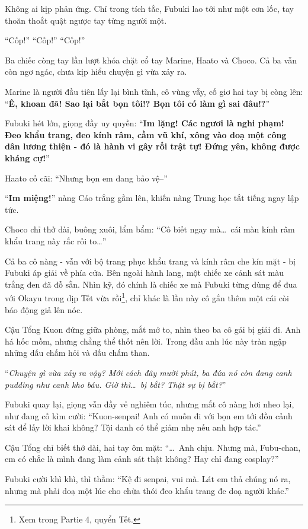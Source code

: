 \documentclass[../main.tex]{subfiles}
\begin{document}

Không ai kịp phản ứng. Chỉ trong tích tắc, Fubuki lao tới như một cơn lốc, tay thoăn thoắt quật ngược tay từng người một.

``Cốp!'' ``Cốp!'' ``Cốp!''

Ba chiếc còng tay lần lượt khóa chặt cổ tay Marine, Haato và Choco. Cả ba vẫn còn ngơ ngác, chưa kịp hiểu chuyện gì vừa xảy ra.

Marine là người đầu tiên lấy lại bình tĩnh, cô vùng vẫy, cố giơ hai tay bị còng lên: ``\textbf{Ê, khoan đã! Sao lại bắt bọn tôi!? Bọn tôi có làm gì sai đâu!?}''

Fubuki hét lớn, giọng đầy uy quyền: ``\textbf{Im lặng! Các ngươi là nghi phạm! Đeo khẩu trang, đeo kính râm, cầm vũ khí, xông vào doạ một công dân lương thiện - đó là hành vi gây rối trật tự! Đứng yên, không được kháng cự!}''

Haato cố cãi: ``Nhưng bọn em đang bảo vệ--''

``\textbf{Im miệng!}'' nàng Cáo trắng gầm lên, khiến nàng Trung học tắt tiếng ngay lập tức.

Choco chỉ thở dài, buông xuôi, lẩm bẩm: ``Cô biết ngay mà\dots\ cái màn kính râm khẩu trang này rắc rối to\dots''

Cả ba cô nàng - vẫn với bộ trang phục khẩu trang và kính râm che kín mặt - bị Fubuki áp giải về phía cửa. Bên ngoài hành lang, một chiếc xe cảnh sát màu trắng đen đã đỗ sẵn. Nhìn kỹ, đó chính là chiếc xe mà Fubuki từng dùng để đua với Okayu trong dịp Tết vừa rồi\footnote{Xem trong {\sen Partie 4}, quyển Tết.}, chỉ khác là lần này cô gắn thêm một cái còi báo động giả lên nóc.

Cậu Tổng Kuon đứng giữa phòng, mắt mở to, nhìn theo ba cô gái bị giải đi. Anh há hốc mồm, nhưng chẳng thể thốt nên lời. Trong đầu anh lúc này tràn ngập những dấu chấm hỏi và dấu chấm than.

``\textit{Chuyện gì vừa xảy ra vậy? Mới cách đây mười phút, ba đứa nó còn đang canh pudding như canh kho báu. Giờ thì\dots\ bị bắt? Thật sự bị bắt?}''

Fubuki quay lại, giọng vẫn đầy vẻ nghiêm túc, nhưng mắt cô nàng hơi nheo lại, như đang cố kìm cười: ``Kuon-senpai! Anh có muốn đi với bọn em tới đồn cảnh sát để lấy lời khai không? Tội danh có thể giảm nhẹ nếu anh hợp tác.''

Cậu Tổng chỉ biết thở dài, hai tay ôm mặt: ``\dots\ Anh chịu. Nhưng mà, Fubu-chan, em có chắc là mình đang làm cảnh sát thật không? Hay chỉ đang cosplay?''

Fubuki cười khì khì, thì thầm: ``Kệ đi senpai, vui mà. Lát em thả chúng nó ra, nhưng mà phải doạ một lúc cho chừa thói đeo khẩu trang đe doạ người khác.''
\end{document}
